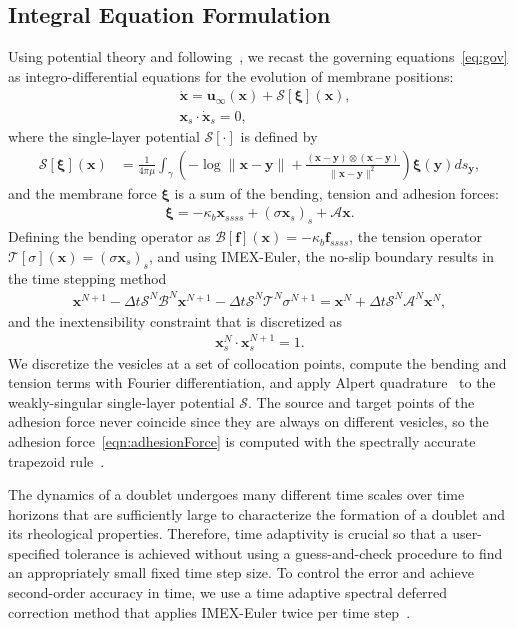\documentclass[prf,superscriptaddress,showkeys]{revtex4-1}
\renewcommand{\AA}{\mathcal{A}}
\newcommand{\BB}{\mathcal{B}}
\newcommand{\ff}{\mathbf{f}}
\renewcommand{\SS}{\mathcal{S}}
\newcommand{\TT}{\mathcal{T}}
\newcommand{\uu}{\mathbf{u}}
\newcommand{\xx}{\mathbf{x}}
\newcommand{\xxi}{\boldsymbol{\xi}}
\newcommand{\yy}{\mathbf{y}}
\begin{document}
\begin{appendices}
\section{Integral Equation Formulation}
\label{sec:AppendixB}
Using potential theory and following~\cite{Veerapaneni2009_JCP}, we recast the governing equations~\eqref{eq:gov} as integro-differential equations for the evolution of membrane positions: 
%
\begin{align*}
  &\dot{\xx} = \uu_{\infty}(\xx) + \SS[\xxi](\xx), \\
  &\xx_s \cdot \dot{\xx}_s = 0,
 \end{align*}
%
where the single-layer potential $\SS[\cdot]$ is defined by
\begin{align}
  \SS[\xxi](\xx) &= \frac{1}{4\pi\mu} \int_\gamma \left(
    -\log \|\xx - \yy\| + \frac{(\xx - \yy) \otimes (\xx - \yy)}{\|\xx - \yy\|^2} \right) 
    \xxi(\yy) ds_\yy, 
  \label{eqn:SLP}
\end{align}
%
and the membrane force $\xxi$ is a sum of the bending, tension and adhesion forces: 
\begin{align}
\xxi = -\kappa_b \xx_{ssss} + (\sigma \xx_s)_s + \AA\xx.
\label{eqn:traction}
\end{align}
Defining the bending operator as $\BB[\ff](\xx) = -\kappa_b \ff_{ssss}$,
the tension operator $\TT[\sigma](\xx) = (\sigma \xx_s)_s$, and using
IMEX-Euler, the no-slip boundary results in the time stepping method
\begin{align*}
  \xx^{N+1} - \Delta t \SS^N \BB^N \xx^{N+1} - 
    \Delta t \SS^N \TT^N \sigma^{N+1} = \xx^N + 
    \Delta t \SS^N \AA^N \xx^N,
\end{align*}
and the inextensibility constraint that is discretized as
\begin{align*}
  \xx_s^{N} \cdot \xx_{s}^{N+1} = 1.
\end{align*}
We discretize the vesicles at a set of collocation points, compute the
bending and tension terms with Fourier differentiation, and apply Alpert
quadrature~\cite{alp1999} to the weakly-singular single-layer potential
$\SS$.  The source and target points of the adhesion force never
coincide since they are always on different vesicles, so the adhesion
force~\eqref{eqn:adhesionForce} is computed with the spectrally accurate
trapezoid rule~\cite{tre-wei2014}.  

The dynamics of a doublet undergoes many different time scales over time
horizons that are sufficiently large to characterize the formation of a
doublet and its rheological properties.  Therefore, time adaptivity is
crucial so that a user-specified tolerance is achieved without using a
guess-and-check procedure to find an appropriately small fixed time step
size.  To control the error and achieve second-order accuracy in time,
we use a time adaptive spectral deferred correction method that
applies IMEX-Euler twice per time step~\cite{quaife2016adaptive}. 



\end{appendices}
\end{document}
